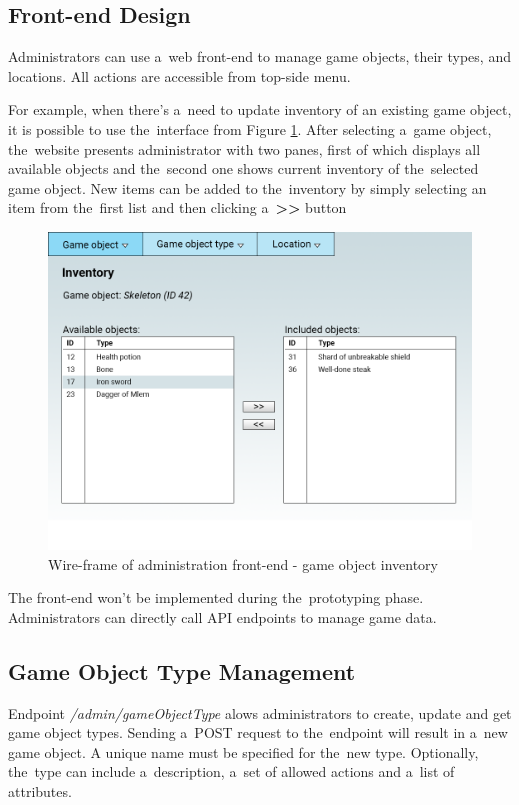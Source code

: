 	\subsection{Front-end Design}
	Administrators can use a~web front-end to manage game objects, their types, and locations. All actions are accessible from top-side menu. 
	
	For example, when there's a~need to update inventory of an existing game object, it is possible to use the~interface from Figure \ref{fig:wireframegameobject}. After selecting a~game object, the~website presents administrator with two panes, first of which displays all available objects and the~second one shows current inventory of the~selected game object. New items can be added to the~inventory by simply selecting an item from the~first list and then clicking a~\textbf{>>} button
	
	\begin{figure}[h]	
		\includegraphics[width=\textwidth]{figures/GameObjectAdminWireframe}
		\centering			
		\caption{Wire-frame of administration front-end - game object inventory}
		\label{fig:wireframegameobject}
	\end{figure}	
	
	The front-end won't be implemented during the~prototyping phase. Administrators can directly call API endpoints to manage game data.	

	\subsection{Game Object Type Management}
	Endpoint \textit{/admin/gameObjectType} alows administrators to create, update and get game object types. Sending a~POST request to the~endpoint will result in a~new game object. A unique name must be specified for the~new type. Optionally, the~type can include a~description, a~set of allowed actions and a~list of attributes.
	
